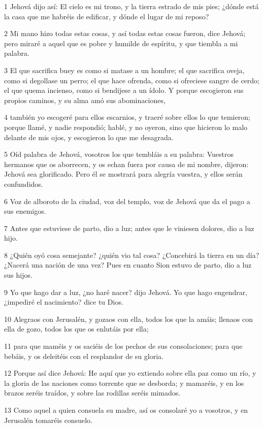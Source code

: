 \par 1 Jehová dijo así: El cielo es mi trono, y la tierra estrado de mis pies; ¿dónde está la casa que me habréis de edificar, y dónde el lugar de mi reposo? 
\par 2 Mi mano hizo todas estas cosas, y así todas estas cosas fueron, dice Jehová; pero miraré a aquel que es pobre y humilde de espíritu, y que tiembla a mi palabra.
\par 3 El que sacrifica buey es como si matase a un hombre; el que sacrifica oveja, como si degollase un perro; el que hace ofrenda, como si ofreciese sangre de cerdo; el que quema incienso, como si bendijese a un ídolo. Y porque escogieron sus propios caminos, y su alma amó sus abominaciones,
\par 4 también yo escogeré para ellos escarnios, y traeré sobre ellos lo que temieron; porque llamé, y nadie respondió; hablé, y no oyeron, sino que hicieron lo malo delante de mis ojos, y escogieron lo que me desagrada.
\par 5 Oíd palabra de Jehová, vosotros los que tembláis a su palabra: Vuestros hermanos que os aborrecen, y os echan fuera por causa de mi nombre, dijeron: Jehová sea glorificado. Pero él se mostrará para alegría vuestra, y ellos serán confundidos.
\par 6 Voz de alboroto de la ciudad, voz del templo, voz de Jehová que da el pago a sus enemigos.
\par 7 Antes que estuviese de parto, dio a luz; antes que le viniesen dolores, dio a luz hijo. 
\par 8 ¿Quién oyó cosa semejante? ¿quién vio tal cosa? ¿Concebirá la tierra en un día? ¿Nacerá una nación de una vez? Pues en cuanto Sion estuvo de parto, dio a luz sus hijos.
\par 9 Yo que hago dar a luz, ¿no haré nacer? dijo Jehová. Yo que hago engendrar, ¿impediré el nacimiento? dice tu Dios.
\par 10 Alegraos con Jerusalén, y gozaos con ella, todos los que la amáis; llenaos con ella de gozo, todos los que os enlutáis por ella;
\par 11 para que maméis y os saciéis de los pechos de sus consolaciones; para que bebáis, y os deleitéis con el resplandor de su gloria.
\par 12 Porque así dice Jehová: He aquí que yo extiendo sobre ella paz como un río, y la gloria de las naciones como torrente que se desborda; y mamaréis, y en los brazos seréis traídos, y sobre las rodillas seréis mimados.
\par 13 Como aquel a quien consuela su madre, así os consolaré yo a vosotros, y en Jerusalén tomaréis consuelo.
